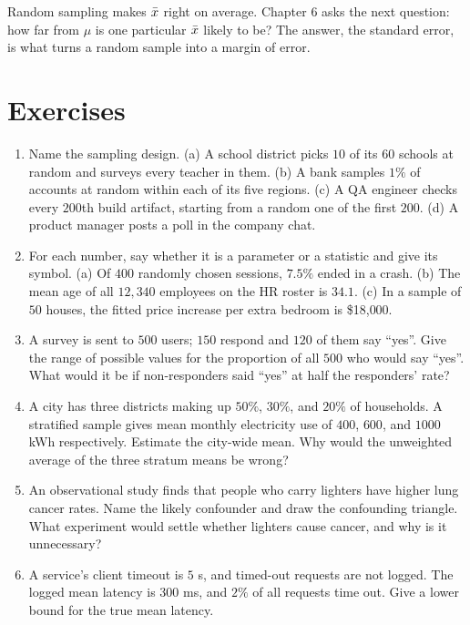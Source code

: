 Random sampling makes $\bar{x}$ right on average. Chapter 6 asks the next question: how far
from $\mu$ is one particular $\bar{x}$ likely to be? The answer, the standard error, is what
turns a random sample into a margin of error.

\section{Exercises}
\label{sec:sampling-exercises}

\begin{enumerate}
  \item Name the sampling design.
  (a) A school district picks $10$ of its $60$ schools at random and surveys every
  teacher in them.
  (b) A bank samples $1\%$ of accounts at random within each of its five regions.
  (c) A QA engineer checks every $200$th build artifact, starting from a random one of
  the first $200$.
  (d) A product manager posts a poll in the company chat.

  \item For each number, say whether it is a parameter or a statistic and give its
  symbol. (a) Of $400$ randomly chosen sessions, $7.5\%$ ended in a crash. (b) The mean
  age of all $12{,}340$ employees on the HR roster is $34.1$. (c) In a sample of $50$
  houses, the fitted price increase per extra bedroom is \$18{,}000.

  \item A survey is sent to $500$ users; $150$ respond and $120$ of them say ``yes''.
  Give the range of possible values for the proportion of all $500$ who would say
  ``yes''. What would it be if non-responders said ``yes'' at half the responders' rate?

  \item A city has three districts making up $50\%$, $30\%$, and $20\%$ of households.
  A stratified sample gives mean monthly electricity use of $400$, $600$, and $1000$ kWh
  respectively. Estimate the city-wide mean. Why would the unweighted average of the three
  stratum means be wrong?

  \item An observational study finds that people who carry lighters have higher lung
  cancer rates. Name the likely confounder and draw the confounding triangle. What
  experiment would settle whether lighters cause cancer, and why is it unnecessary?

  \item A service's client timeout is $5$ s, and timed-out requests are not logged. The
  logged mean latency is $300$ ms, and $2\%$ of all requests time out. Give a lower bound
  for the true mean latency.


\end{enumerate}
